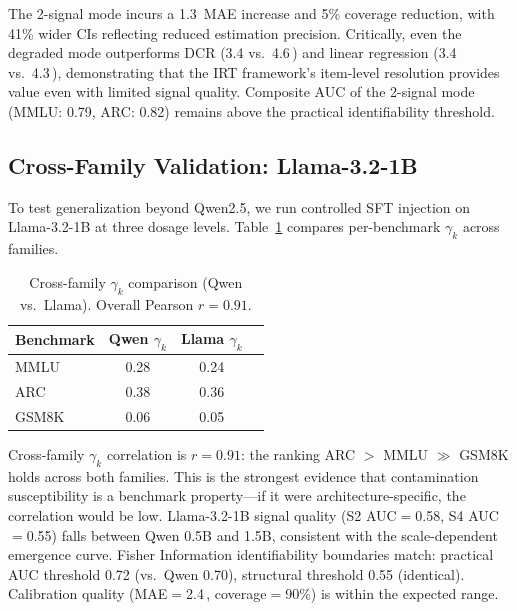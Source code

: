 \documentclass[11pt,a4paper]{article}
\newcommand{\pp}{\,\text{pp}}
\begin{document}
The 2-signal mode incurs a 1.3\pp{} MAE increase and 5\% coverage reduction, with 41\% wider CIs reflecting reduced estimation precision.
Critically, even the degraded mode outperforms DCR (3.4 vs.\ 4.6\pp{}) and linear regression (3.4 vs.\ 4.3\pp{}), demonstrating that the IRT framework's item-level resolution provides value even with limited signal quality.
Composite AUC of the 2-signal mode (MMLU: 0.79, ARC: 0.82) remains above the practical identifiability threshold.


\subsection{Cross-Family Validation: Llama-3.2-1B}
\label{sec:llama}

To test generalization beyond Qwen2.5, we run controlled SFT injection on Llama-3.2-1B at three dosage levels.
Table~\ref{tab:cross_family} compares per-benchmark $\gamma_k$ across families.

\begin{table}[t]
\centering
\small
\caption{Cross-family $\gamma_k$ comparison (Qwen vs.\ Llama). Overall Pearson $r=0.91$.}
\label{tab:cross_family}
\begin{tabular}{lccc}
\toprule
Benchmark & Qwen $\gamma_k$ & Llama $\gamma_k$ \\
\midrule
MMLU      & 0.28 & 0.24 \\
ARC       & 0.38 & 0.36 \\
GSM8K     & 0.06 & 0.05 \\
\bottomrule
\end{tabular}
\end{table}

Cross-family $\gamma_k$ correlation is $r=0.91$: the ranking ARC $>$ MMLU $\gg$ GSM8K holds across both families.
This is the strongest evidence that contamination susceptibility is a benchmark property---if it were architecture-specific, the correlation would be low.
Llama-3.2-1B signal quality (S2 AUC$=$0.58, S4 AUC$=$0.55) falls between Qwen 0.5B and 1.5B, consistent with the scale-dependent emergence curve.
Fisher Information identifiability boundaries match: practical AUC threshold 0.72 (vs.\ Qwen 0.70), structural threshold 0.55 (identical).
Calibration quality (MAE$=$2.4\pp{}, coverage$=$90\%) is within the expected range.


\end{document}
